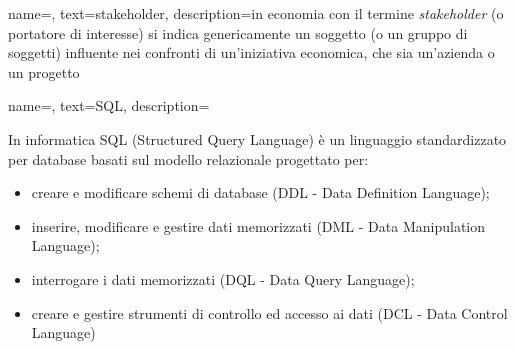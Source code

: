 {
    name=,
    text=stakeholder,
    description={in economia con il termine \emph{stakeholder} (o portatore di interesse)
si indica genericamente un soggetto (o un gruppo di soggetti) influente nei
confronti di un’iniziativa economica, che sia un’azienda o un progetto}
}

{
    name=,
    text=SQL,
    description={In informatica SQL (Structured Query Language) è un linguaggio standardizzato per database basati sul modello relazionale progettato per:
\begin{itemize}
	\item creare e modificare schemi di database (DDL - Data Definition Language);
	\item inserire, modificare e gestire dati memorizzati (DML - Data Manipulation
Language);
	\item interrogare i dati memorizzati (DQL - Data Query Language);
	\item creare e gestire strumenti di controllo ed accesso ai dati (DCL - Data Control
Language)
\end{itemize}}
}

